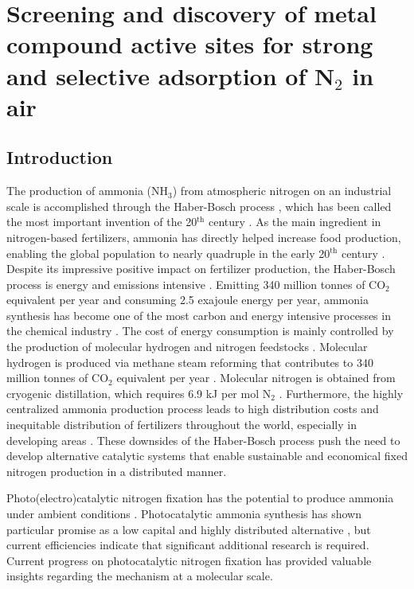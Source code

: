 
\chapter{Screening and discovery of metal compound active sites for strong and selective adsorption of N$_2$ in air}

\section*{Introduction}
\label{introduction}
The production of ammonia (NH$_3$) from atmospheric nitrogen on an industrial scale is accomplished through the Haber-Bosch process \cite{Schloegl_2003}, which has been called the most important invention of the 20$^{\mathrm{th}}$ century \cite{Smil_1999}. As the main ingredient in nitrogen-based fertilizers, ammonia has directly helped increase food production, enabling the global population to nearly quadruple in the early 20$^{\mathrm{th}}$ century \cite{Smil_1999}. Despite its impressive positive impact on fertilizer production, the Haber-Bosch process is energy and emissions intensive \cite{norskov_2016, SCHIFFER_2017, Comer2019ProspectsFertilizers}. Emitting 340 million tonnes of CO$_2$ equivalent per year and consuming 2.5 exajoule energy per year, ammonia synthesis has become one of the most carbon and energy intensive processes in the chemical industry \cite{Liu2022ProspectsFixation, Comer_sustainable, Comer2019ProspectsFertilizers,Suryanto2021NitrogenShuttle}. The cost of energy consumption is mainly controlled by the production of molecular hydrogen and nitrogen feedstocks \cite{Comer2019ProspectsFertilizers, Etienne2016PriceMarkets, Huang2007ImpactSupply}. Molecular hydrogen is produced via methane steam reforming that contributes to 340 million tonnes of CO$_2$ equivalent per year \cite{Abbas_2010}. Molecular nitrogen is obtained from cryogenic distillation, which requires 6.9 kJ per mol N$_2$ \cite{Taniguchi2015EnergyAnalysis}. Furthermore, the highly centralized ammonia production process leads to high distribution costs and inequitable distribution of fertilizers throughout the world, especially in developing areas \cite{ COMER_2019,Medford_2017, Gilbert_2012}. These downsides of the Haber-Bosch process push the need to develop alternative catalytic systems that enable sustainable and economical fixed nitrogen production in a distributed manner. 

Photo(electro)catalytic nitrogen fixation has the potential to produce ammonia under ambient conditions \cite{Chen2017ElectrocatalyticElectrocatalyst, Chen2018BeyondTransformations, Skulason_2012, Iriawan_2021, Comer2018TheTitania, Comer2018AnalysisTiO2110,Montoya2015TheRelations,Medford2017Photon-DrivenOutlook, Vojvodic2014ExploringProcess}. Photocatalytic ammonia synthesis has shown particular promise as a low capital and highly distributed alternative \cite{Comer2019ProspectsFertilizers}, but current efficiencies indicate that significant additional research is required. Current progress on photocatalytic nitrogen fixation has provided valuable insights regarding the mechanism at a molecular scale. 


